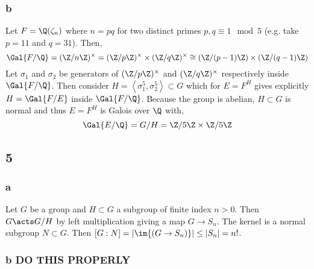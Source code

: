 \documentclass[12pt]{article}
\begin{document}
\subsubsection{b}

Let $F = \Q(\zeta_n)$ where $n = p q$ for two distinct primes $p,q \equiv 1 \mod 5$ (e.g. take $p = 11$ and $q = 31$). Then,
\[ \Gal{F / \Q} = (\Z / n \Z)^\times = (\Z / p \Z)^\times \times (\Z / q \Z)^\times \cong (\Z / (p-1) \Z) \times (\Z / (q - 1) \Z) \]
Let $\sigma_1$ and $\sigma_2$ be generators of $(\Z / p \Z)^\times$ and $(\Z / q \Z)^\times$ respectively inside $\Gal{F/\Q}$. Then consider $H = \left< \sigma_1^5, \sigma_2^5 \right> \subset G$ which for $E = F^H$ gives explicitly $H = \Gal{F/E}$ inside $\Gal{F/\Q}$. Because the group is abelian, $H \subset G$ is normal and thus $E = F^H$ is Galois over $\Q$ with,
\[ \Gal{E/\Q} = G / H = \Z / 5 \Z \times \Z / 5 \Z \]

\subsection{5}

\subsubsection{a}

Let $G$ be a group and $H \subset G$ a subgroup of finite index $n > 0$. Then $G \acts G / H$ by left multiplication giving a map $G \to S_n$. The kernel is a normal subgroup $N \subset G$. Then $[G : N] = |\im{(G \to S_n)}| \le |S_n| = n!$.

\subsubsection{b DO THIS PROPERLY}
\end{document}
